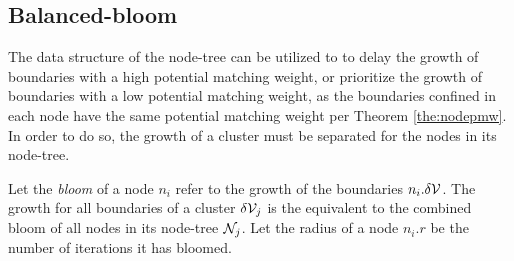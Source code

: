 

\subsection{Balanced-bloom}

The data structure of the node-tree can be utilized to to delay the growth of boundaries with a high potential matching weight, or prioritize the growth of boundaries with a low potential matching weight, as the boundaries confined in each node have the same potential matching weight per Theorem \ref{the:nodepmw}. In order to do so, the growth of a cluster must be separated for the nodes in its node-tree. 

\begin{definition}\label{def:bloom}
  Let the \emph{bloom} of a node $n_i$ refer to the growth of the boundaries $n_i.\delta\mathcal{V}$. The growth for all boundaries of a cluster $
  \delta\mathcal{V}_j$ is the equivalent to the combined bloom of all nodes in its node-tree $\mathcal{N}_j$. Let the radius of a node $n_i.r$ be the number of iterations it has bloomed. 
\end{definition}


